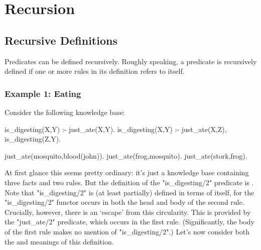 
\chapter{Recursion}\label{CHAPTER3}


\section{Recursive Definitions}\label{SEC.L3.RECURSIVE.DEFINITION}



Predicates can be defined recursively.  Roughly speaking, a predicate
is recursively defined if one or more rules in its definition refers
to itself.

\subsection*{Example 1: Eating}\label{SUBSEC.L3.EX1}



Consider the following knowledge base:
\begin{LPNcodedisplay}
is_digesting(X,Y) :- just_ate(X,Y).
is_digesting(X,Y) :-
        just_ate(X,Z),
        is_digesting(Z,Y).

just_ate(mosquito,blood(john)).
just_ate(frog,mosquito).
just_ate(stork,frog).
\end{LPNcodedisplay}


At first glance this seems pretty ordinary: it's just a knowledge base
containing three facts and two rules.  But the definition of the
"is_digesting/2" predicate is .  Note that
"is_digesting/2" is (at least partially) defined in terms of itself,
for the "is_digesting/2" functor occurs in both the head and body of
the second rule.  Crucially, however, there is an `escape' from this
circularity.  This is provided by the "just_ate/2" predicate, which
occurs in the first rule.  (Significantly, the body of the first rule
makes no mention of "is_digesting/2".)  Let's now consider both the
 and  meanings of this definition.

